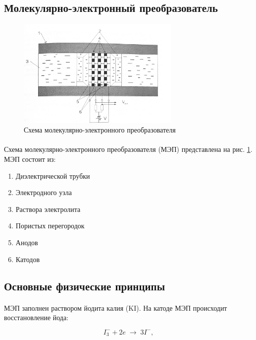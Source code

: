 \documentclass[a4paper,12pt]{article} %
\begin{document}
\subsection{Молекулярно-электронный преобразователь}

\begin{figure}[h]
\centering
\includegraphics[width=0.7\textwidth]{setup.png}
\caption{Схема молекулярно-электронного преобразователя}
\label{fig:setup}
\end{figure}

\paragraph{} Схема молекулярно-электронного преобразователя (МЭП) представлена на рис. \ref{fig:setup}. МЭП состоит из:
\begin{enumerate}
\itemsep-0.5em
\item Диэлектрической трубки
\item Электродного узла
\item Раствора электролита
\item Пористых перегородок
\item Анодов
\item Катодов
\end{enumerate}

\subsection{Основные физические принципы}

\paragraph{} МЭП заполнен раствором йодита калия (KI). На катоде МЭП происходит восстановление йода:

\[ I_3^- + 2e \; \rightarrow \; 3I^- ,\]
\end{document}
